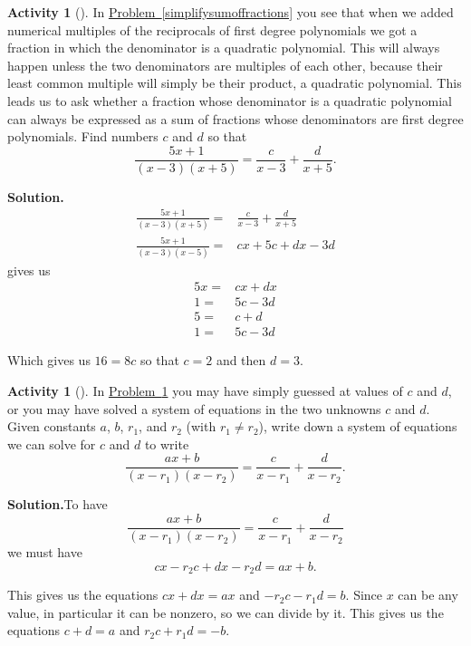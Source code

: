 \documentclass[10pt,]{book}
\theoremstyle{plain}
\theoremstyle{definition}
\newtheorem{activity}[project]{Activity}
\numberwithin{equation}{chapter}
\newcommand{\amp}{&}
\begin{document}
\begin{activity}[]\label{partialfractionsintro}
In \hyperref[simplifysumoffractions]{Problem~\ref{simplifysumoffractions}} you see that when we added numerical multiples of the reciprocals of first degree polynomials we got a fraction in which the denominator is a quadratic polynomial. This will always happen unless the two denominators are multiples of each other, because their least common multiple will simply be their product, a quadratic polynomial. This leads us to ask whether a fraction whose denominator is a quadratic polynomial can always be expressed as a sum of fractions whose denominators are first degree polynomials. Find numbers \(c\) and \(d\) so that%
\begin{equation*}
\frac{5x+1}{(x-3)(x+5)} = \frac{c}{x-3} + \frac{d}{x+5}.
\end{equation*}
%
\par\medskip\noindent%
\textbf{Solution.}\quad %
\begin{align*}
\frac{5x+1}{(x-3)(x+5)}  =\amp  \frac{c}{x-3} + \frac{d}{x+5}\\
\frac{5x+1}{(x-3)(x-5)}  =\amp cx+5c+dx-3d
\end{align*}
gives us%
\begin{align*}
5x =\amp cx+dx\\
1 =\amp 5c-3d\\
5 =\amp c+d\\
1 =\amp 5c-3d
\end{align*}
%
\par
Which gives us \(16=8c\) so that \(c=2\) and then \(d=3\).%
\end{activity}
\begin{activity}[]\label{partialfractions1}
In \hyperref[partialfractionsintro]{Problem~\ref{partialfractionsintro}} you may have simply guessed at values of \(c\) and \(d\), or you may have solved a system of equations in the two unknowns \(c\) and \(d\). Given constants \(a\), \(b\), \(r_1\), and \(r_2\) (with \(r_1\not= r_2\)), write down a system of equations we can solve for \(c\) and \(d\) to write%
\begin{equation*}
\frac{ax+b}{(x-r_1)(x-r_2)} = \frac{c}{x-r_1} + \frac{d}{x-r_2}.
\end{equation*}
%
\par\medskip\noindent%
\textbf{Solution.}\quad To have%
\begin{equation*}
\frac{ax+b}{(x-r_1)(x-r_2)} =  \frac{c}{x-r_1} + \frac{d}{x-r_2}
\end{equation*}
we must have%
\begin{equation*}
cx-r_2c+dx-r_2d = ax+b.
\end{equation*}
%
\par
This gives us the equations \(cx+dx=ax\) and \(-r_2c-r_1d=b\). Since \(x\) can be any value, in particular it can be nonzero, so we can divide by it. This gives us the equations \(c+d=a\) and \(r_2c+r_1d=-b\).%
\end{activity}
\end{document}
